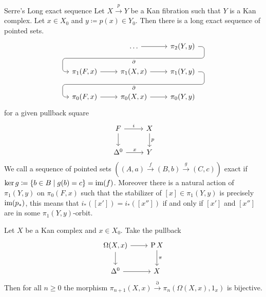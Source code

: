\begin{thm}{Serre's Long exact sequence}
\label{Serre's Long exact sequence}
    Let $X \xrightarrow{p} Y$ be a Kan fibration such that $Y$ is a Kan complex. Let $x \in X_0$ and $y\coloneqq p(x) \in Y_0$. Then there is a long exact sequence of pointed sets.
    \[
    \begin{tikzcd}
        & 
        \dotsc
        \rar
        \arrow[d, phantom, ""{coordinate, name=Z1}]
        &
        \pi_2(Y,y)
        \arrow[ dll,
                        "\partial", pos=1,
                        rounded corners,
                        to path={ -- ([xshift=2ex]\tikztostart.east)
                                  |- (Z1) \tikztonodes
                                  -| ([xshift=-2ex]\tikztotarget.west)
                                  -- (\tikztotarget)}
                      ]
        \\
        \pi_1(F,x)
        \rar
        & 
        \pi_1(X,x)
        \rar
        \arrow[d, phantom, ""{coordinate, name=Z}]
        &
        \pi_1(Y,y)
        \arrow[ dll,
                        "\partial", pos=1,
                        rounded corners,
                        to path={ -- ([xshift=2ex]\tikztostart.east)
                                  |- (Z) \tikztonodes
                                  -| ([xshift=-2ex]\tikztotarget.west)
                                  -- (\tikztotarget)}
                      ]
        \\
        \pi_0(F,x)
        \rar
        &
        \pi_0(X,x)
        \rar
        &
        \pi_0(Y,y)
    \end{tikzcd}
    \]
    for a given pullback square
    \[
    \begin{tikzcd}
        F
        \ar[r, "i"]
        \ar[d]
        &
        X
        \ar[d, "p"]
        \\
        \Delta^0
        \ar[r,"x"]
        &
        Y
    \end{tikzcd}
    \]
    We call a sequence of pointed sets $((A,a) \xrightarrow{f} (B,b) \xrightarrow{g} (C,c))$ exact if $\ker g \coloneqq \{b \in B \mid g(b) = c\} = \operatorname{im} (f)$. 
    Moreover there is a natural action of $\pi_1(Y,y)$ on $\pi_0(F,x)$ such that the stabilizer of $[x] \in \pi_1(Y,y)$ is precisely $\operatorname{im}(p_*)$, this means that $i_*([x'])=i_*([x''])$ if and only if $[x']$ and $[x'']$ are in some $\pi_1(Y,y)$-orbit.
\end{thm}

\begin{cor}
    Let $X$ be a Kan complex and $x \in X_0$. Take the pullback 
    \[
    \begin{tikzcd}
        \Omega(X,x)
        \rar
        \dar
        &
        \Pathspace X
        \ar[d, "\pi"]
        \\
        \Delta^0
        \rar
        &
        X
    \end{tikzcd}
    \]
    Then for all $n \geq 0$ the morphism $\pi_{n+1}(X,x) \xrightarrow{\partial} \pi_n(\Omega(X,x),1_x)$ is bijective.
\end{cor}

